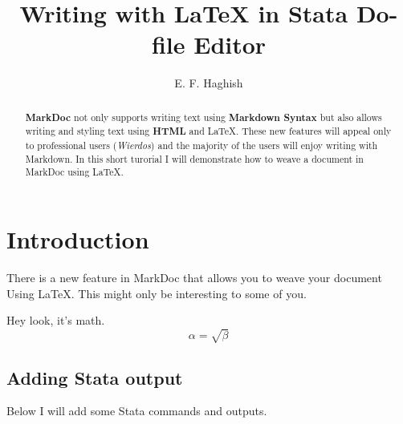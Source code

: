 \documentclass{article}
\begin{document}
\title{Writing with \LaTeX{} in Stata Do-file Editor}
\author{E. F. Haghish}

\maketitle

\begin{abstract}
\textbf{MarkDoc} not only supports writing text using \textbf{Markdown Syntax}
but also allows writing and styling text using \textbf{HTML} and \LaTeX{}.
These new features will appeal only to professional users (\textit{Wierdos})
and the majority of the users will enjoy writing with Markdown. In this
short turorial I will demonstrate how to weave a document in MarkDoc using
\LaTeX{}.
\end{abstract}

\section{Introduction}
There is a new feature in MarkDoc that allows you to weave your document
Using \LaTeX{}. This might only be interesting to some of you.

Hey look, it's math.
\begin{equation}
\label{simple_equation}
\alpha = \sqrt{ \beta }
\end{equation}

\subsection{Adding Stata output}
Below I will add some Stata commands and outputs.
\end{document}
